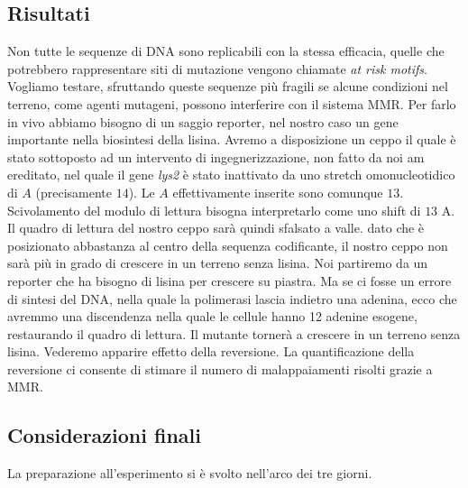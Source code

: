  
 \subsection*{Risultati}
 Non tutte le sequenze di DNA sono replicabili con la stessa efficacia, quelle che potrebbero rappresentare siti di mutazione vengono chiamate \textit{at risk motifs}. 
 Vogliamo testare, sfruttando queste sequenze più fragili se alcune condizioni nel terreno, come agenti mutageni, possono interferire con il sistema MMR. 
Per farlo in vivo abbiamo bisogno di un saggio reporter, nel nostro caso un gene importante nella biosintesi della lisina. 
Avremo a disposizione un ceppo il quale è stato sottoposto ad un intervento di ingegnerizzazione, non fatto da noi am ereditato, nel quale il gene \emph{lys2} è stato inattivato da uno stretch omonucleotidico di $A$ (precisamente $14$). 
Le $A$ effettivamente inserite sono comunque $13$. 
Scivolamento del modulo di lettura bisogna interpretarlo come uno shift di $13$ A. 
Il quadro di lettura del nostro ceppo sarà quindi sfalsato a valle. 
dato che è posizionato abbastanza al centro della sequenza codificante, il nostro ceppo non sarà più in grado di crescere in un terreno senza lisina. 
Noi partiremo da un reporter che ha bisogno di lisina per crescere su piastra. 
Ma se ci fosse un errore di sintesi del DNA, nella quale la polimerasi lascia indietro una adenina, ecco che avremmo una discendenza nella quale le cellule hanno 12 adenine esogene, restaurando il quadro di lettura. 
Il mutante tornerà a crescere in un terreno senza lisina. 
Vederemo apparire effetto della reversione. 
La quantificazione della reversione ci consente di stimare il numero di malappaiamenti risolti grazie a MMR.
 
 \subsection*{Considerazioni finali}
 La preparazione all'esperimento si è svolto nell'arco dei tre giorni. 

